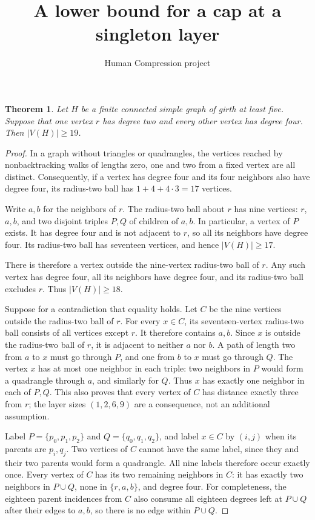 \documentclass[11pt]{article}
\title{A lower bound for a cap at a singleton layer}
\author{Human Compression project}
\date{}
\newtheorem{theorem}{Theorem}
\begin{document}
\maketitle

\begin{theorem}\label{cap}
Let $H$ be a finite connected simple graph of girth at least five.
Suppose that one vertex $r$ has degree two and every other vertex has
degree four. Then $|V(H)|\geq19$.
\end{theorem}
\begin{proof}
In a graph without triangles or quadrangles, the vertices reached by
nonbacktracking walks of lengths zero, one and two from a fixed vertex
are all distinct. Consequently, if a vertex has degree four and its
four neighbors also have degree four, its radius-two ball has
$1+4+4\cdot3=17$ vertices.

Write $a,b$ for the neighbors of $r$. The radius-two ball about $r$
has nine vertices: $r$, $a,b$, and two disjoint triples $P,Q$ of
children of $a,b$. In particular, a vertex of $P$ exists. It has
degree four and is not adjacent to $r$, so all its neighbors have
degree four. Its radius-two ball has seventeen vertices, and hence
$|V(H)|\geq17$.

There is therefore a vertex outside the nine-vertex radius-two ball
of $r$. Any such vertex has degree four, all its neighbors have degree
four, and its radius-two ball excludes $r$. Thus $|V(H)|\geq18$.

Suppose for a contradiction that equality holds. Let $C$ be the nine
vertices outside the radius-two ball of $r$. For every $x\in C$,
its seventeen-vertex radius-two ball consists of all vertices except
$r$. It therefore contains $a,b$. Since $x$ is outside the radius-two
ball of $r$, it is adjacent to neither $a$ nor $b$. A path of length
two from $a$ to $x$ must go through $P$, and one from $b$ to $x$
must go through $Q$. The vertex $x$ has at most one neighbor in each
triple: two neighbors in $P$ would form a quadrangle through $a$,
and similarly for $Q$. Thus $x$ has exactly one neighbor in each of
$P,Q$. This also proves that every vertex of $C$ has distance exactly
three from $r$; the layer sizes $(1,2,6,9)$ are a consequence, not an
additional assumption.

Label $P=\{p_0,p_1,p_2\}$ and $Q=\{q_0,q_1,q_2\}$, and label
$x\in C$ by $(i,j)$ when its parents are $p_i,q_j$. Two vertices of
$C$ cannot have the same label, since they and their two parents
would form a quadrangle. All nine labels therefore occur exactly once.
Every vertex of $C$ has its two remaining neighbors in $C$: it has
exactly two neighbors in $P\cup Q$, none in $\{r,a,b\}$, and degree
four. For completeness, the eighteen parent incidences from $C$
also consume all eighteen degrees left at $P\cup Q$ after their
edges to $a,b$, so there is no edge within $P\cup Q$.


\end{proof}
\end{document}
